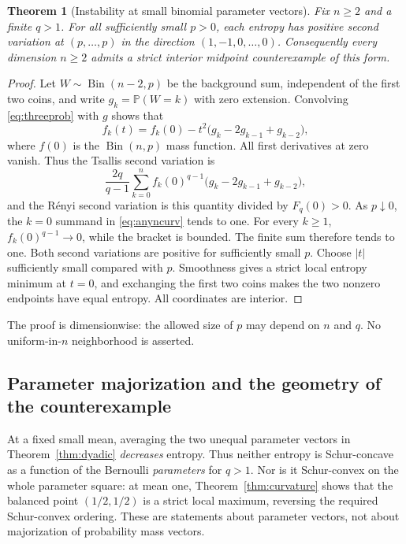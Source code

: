 \documentclass[11pt]{article}
\numberwithin{equation}{section}
\newtheorem{theorem}{Theorem}[section]
\theoremstyle{definition}
\theoremstyle{remark}
\newcommand{\Bin}{\operatorname{Bin}}
\begin{document}
\begin{theorem}[Instability at small binomial parameter vectors]
\label{thm:anyn}
Fix $n\geq2$ and a finite $q>1$. For all sufficiently small $p>0$, each
entropy has positive second variation at $(p,\ldots,p)$ in the direction
$(1,-1,0,\ldots,0)$. Consequently every dimension $n\geq2$ admits a strict
interior midpoint counterexample of this form.
\end{theorem}
\begin{proof}
Let $W\sim\Bin(n-2,p)$ be the background sum, independent of the first two
coins, and write $g_k=\mathbb P(W=k)$ with zero extension. Convolving
\eqref{eq:threeprob} with $g$ shows that
\begin{equation}
 f_k(t)=f_k(0)-t^2\bigl(g_k-2g_{k-1}+g_{k-2}\bigr),
 \label{eq:background}
\end{equation}
where $f(0)$ is the $\Bin(n,p)$ mass function. All first derivatives at zero
vanish. Thus the Tsallis second variation is
\begin{equation}
 \frac{2q}{q-1}\sum_{k=0}^n f_k(0)^{q-1}
              \bigl(g_k-2g_{k-1}+g_{k-2}\bigr),\label{eq:anyncurv}
\end{equation}
and the R\'enyi second variation is this quantity divided by $F_q(0)>0$.
As $p\downarrow0$, the $k=0$ summand in \eqref{eq:anyncurv} tends to one.
For every $k\geq1$, $f_k(0)^{q-1}\to0$, while the bracket is bounded.
The finite sum therefore tends to one. Both second variations are positive
for sufficiently small $p$.
Choose $|t|$ sufficiently small compared with $p$. Smoothness gives a strict
local entropy minimum at $t=0$, and exchanging the first two coins makes
the two nonzero endpoints have equal entropy. All coordinates are interior.
\end{proof}

The proof is dimensionwise: the allowed size of $p$ may depend on $n$ and
$q$. No uniform-in-$n$ neighborhood is asserted.

\subsection{Parameter majorization and the geometry of the counterexample}
At a fixed small mean, averaging the two unequal parameter vectors in
Theorem~\ref{thm:dyadic} \emph{decreases} entropy. Thus neither entropy is
Schur-concave as a function of the Bernoulli \emph{parameters} for $q>1$.
Nor is it Schur-convex on the whole parameter square: at mean one,
Theorem~\ref{thm:curvature} shows that the balanced point $(1/2,1/2)$ is a
strict local maximum, reversing the required Schur-convex ordering.
These are statements about parameter vectors, not about majorization of
probability mass vectors.
\end{document}
